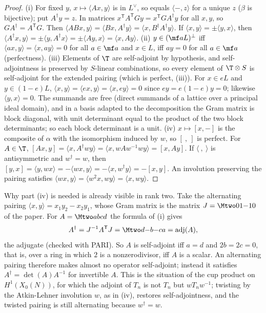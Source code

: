 \begin{proof}
(i) For fixed $y$, $x\mapsto\langle Ax,y\rangle$ is in $L^\vee$, so equals $\langle-,z\rangle$ for a unique $z$ ($\beta$ is bijective); put $A^\dagger y=z$. In matrices
$x^{\mathsf T}A^{\mathsf T}Gy=x^{\mathsf T}GA^\dagger y$ for all $x,y$, so $GA^\dagger=A^{\mathsf T}G$. Then $\langle ABx,y\rangle=\langle Bx,A^\dagger y\rangle=\langle x,B^\dagger A^\dagger y\rangle$. If
$\langle x,y\rangle=\pm\langle y,x\rangle$, then $\langle A^\dagger x,y\rangle=\pm\langle y,A^\dagger x\rangle=\pm\langle Ay,x\rangle=\langle x,Ay\rangle$.
(ii) $y\in(\mf aL)^\perp$ iff $\langle ax,y\rangle=\langle x,ay\rangle=0$ for all $a\in\mf a$ and $x\in L$, iff $ay=0$ for all $a\in\mf a$ (perfectness).
(iii) Elements of $\T$ are self-adjoint by hypothesis, and self-adjointness is preserved by $S$-linear combinations, so every element of
$\T\otimes S$ is self-adjoint for the extended pairing (which is perfect, (iii)). For $x\in eL$ and $y\in(1-e)L$,
$\langle x,y\rangle=\langle ex,y\rangle=\langle x,ey\rangle=0$ since $ey=e(1-e)y=0$; likewise $\langle y,x\rangle=0$. The summands are free (direct summands of a lattice over a
principal ideal domain), and in a basis adapted to the decomposition the Gram matrix is block diagonal, with unit determinant equal to the
product of the two block determinants; so each block determinant is a unit.
(iv) $x\mapsto[x,-]$ is the composite of $\alpha$ with the isomorphism induced by $w$, so $[\ ,\ ]$ is perfect. For $A\in\T$,
$[Ax,y]=\langle x,A^\dagger wy\rangle=\langle x,wAw^{-1}wy\rangle=[x,Ay]$. If $\langle\ ,\ \rangle$ is antisymmetric and $w^\dagger=w$, then
$[y,x]=\langle y,wx\rangle=-\langle wx,y\rangle=-\langle x,w^\dagger y\rangle=-[x,y]$. An involution preserving the pairing satisfies $\langle wx,y\rangle=\langle w^2x,wy\rangle=\langle x,wy\rangle$.
\end{proof}

Why part (iv) is needed is already visible in rank two. Take the alternating pairing $\langle x,y\rangle=x_1y_2-x_2y_1$, whose Gram matrix is
the matrix $J=\Mtwo01{-1}0$ of the paper. For $A=\Mtwo abcd$ the formula of (i) gives
\[
A^\dagger=J^{-1}A^{\mathsf T}J=\Mtwo d{-b}{-c}a=\operatorname{adj}(A),
\]
the adjugate (checked with PARI). So $A$ is self-adjoint iff $a=d$ and $2b=2c=0$, that is, over a ring in which $2$ is a nonzerodivisor, iff
$A$ is a scalar. An alternating pairing therefore makes almost no operator self-adjoint; instead it satisfies $A^\dagger=\det(A)A^{-1}$ for invertible
$A$. This is the situation of the cup product on $H^1(X_0(N))$, for which the adjoint of $T_n$ is not $T_n$ but $wT_nw^{-1}$; twisting by the
Atkin-Lehner involution $w$, as in (iv), restores self-adjointness, and the twisted pairing is still alternating because $w^\dagger=w$.

